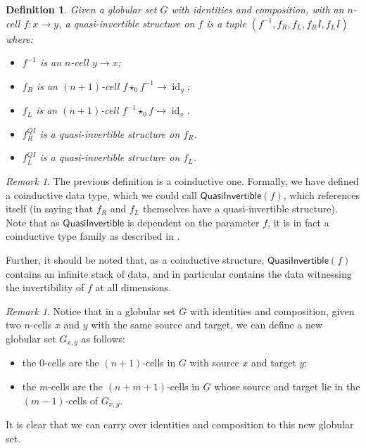 \documentclass[draft]{article}
\newtheorem{definition}[theorem]{Definition} \theoremstyle{remark}
\newtheorem{remark}[theorem]{Remark} \newtheorem*{claim}{Claim}
\DeclareMathOperator{\id}{id}
\newcommand{\inv}[1]{#1^{-1}} \newcommand{\comp}{\star}
\begin{document}
\begin{definition}
  Given a globular set \(G\) with identities and composition, with an
  \(n\)-cell \(f : x \to y\), a \emph{quasi-invertible} structure on
  \(f\) is a tuple \((\inv f, f_R, f_L, f_R{}I, f_L{}I)\) where:
  \begin{itemize}
  \item \(\inv f\) is an \(n\)-cell \(y \to x\);
  \item \(f_R\) is an \((n+1)\)-cell \(f \comp_0 \inv f \to \id_y\);
  \item \(f_L\) is an \((n+1)\)-cell \(\inv f \comp_0 f \to \id_x\).
  \item \(f_R^{QI}\) is a quasi-invertible structure on \(f_R\).
  \item \(f_L^{QI}\) is a quasi-invertible structure on \(f_L\).
  \end{itemize}
\end{definition}

\begin{remark}
  The previous definition is a coinductive one. Formally, we have
  defined a coinductive data type, which we could call
  \(\mathsf{QuasiInvertible}(f)\), which references itself (in saying
  that \(f_R\) and \(f_L\) themselves have a quasi-invertible
  structure). Note that as \(\mathsf{QuasiInvertible}\) is dependent
  on the parameter \(f\), it is in fact a coinductive type family as
  described in .

  Further, it should be noted that, as a coinductive structure,
  \(\mathsf{QuasiInvertible}(f)\) contains an infinite stack of data,
  and in particular contains the data witnessing the invertibility of
  \(f\) at all dimensions.
\end{remark}

\begin{remark}\label{descendants}
  Notice that in a globular set \(G\) with identities and composition,
  given two \(n\)-cells \(x\) and \(y\) with the same source and
  target, we can define a new globular set \(G_{x,y}\) as follows:
  \begin{itemize}
  \item the \(0\)-cells are the \((n+1)\)-cells in \(G\) with source
    \(x\) and target \(y\);
  \item the \(m\)-cells are the \((n+m+1)\)-cells in \(G\) whose
    source and target lie in the \((m-1)\)-cells of \(G_{x,y}\).
  \end{itemize}
  It is clear that we can carry over identities and composition to
  this new globular set.
\end{remark}
\end{document}
